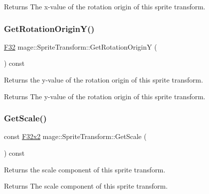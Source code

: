 \begin{DoxyReturn}{Returns}
The x-\/value of the rotation origin of this sprite transform. 
\end{DoxyReturn}
\hypertarget{classmage_1_1_sprite_transform_a762326097353f1303eede1b716cb9f51}{}\label{classmage_1_1_sprite_transform_a762326097353f1303eede1b716cb9f51} 
\subsubsection{\texorpdfstring{Get\+Rotation\+Origin\+Y()}{GetRotationOriginY()}}
{\footnotesize\ttfamily \hyperlink{namespacemage_aa97e833b45f06d60a0a9c4fc22ae02c0}{F32} mage\+::\+Sprite\+Transform\+::\+Get\+Rotation\+OriginY (\begin{DoxyParamCaption}{ }\end{DoxyParamCaption}) const\hspace{0.3cm}{\ttfamily [noexcept]}}

Returns the y-\/value of the rotation origin of this sprite transform.

\begin{DoxyReturn}{Returns}
The y-\/value of the rotation origin of this sprite transform. 
\end{DoxyReturn}
\hypertarget{classmage_1_1_sprite_transform_a5dd81c8943599dc25952d8c62fb81252}{}\label{classmage_1_1_sprite_transform_a5dd81c8943599dc25952d8c62fb81252} 
\subsubsection{\texorpdfstring{Get\+Scale()}{GetScale()}}
{\footnotesize\ttfamily const \hyperlink{namespacemage_aa87237ad091f5cd7da612b8523fc108f}{F32x2} mage\+::\+Sprite\+Transform\+::\+Get\+Scale (\begin{DoxyParamCaption}{ }\end{DoxyParamCaption}) const\hspace{0.3cm}{\ttfamily [noexcept]}}

Returns the scale component of this sprite transform.

\begin{DoxyReturn}{Returns}
The scale component of this sprite transform. 
\end{DoxyReturn}
\hypertarget{classmage_1_1_sprite_transform_af82246da3228dfc1588ca806ddf6315f}{}\label{classmage_1_1_sprite_transform_af82246da3228dfc1588ca806ddf6315f} 
